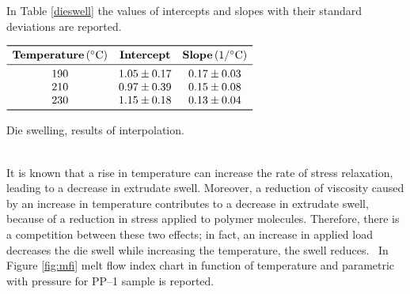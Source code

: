 \documentclass[a4paper, 11pt]{article}
\begin{document}
In Table \ref{dieswell} the values of intercepts and slopes with their standard deviations are reported.
\begin{table}[htp]
	\centering
	$
	\begin{array}{ccc}
	\toprule
	\textbf{Temperature}\, (^\circ \text{C}) & \textbf{Intercept} & \textbf{Slope} \, (1/^\circ \text{C}) \\
	\midrule
	190 & 1.05 \pm 0.17 & 0.17 \pm 0.03 \\
	210 & 0.97 \pm 0.39 & 0.15 \pm 0.08 \\
	230 & 1.15 \pm 0.18 & 0.13 \pm 0.04 \\
	\bottomrule
	\end{array}
	$
	\caption{Die swelling, results of interpolation.}
	\label{tab:dieswell}
\end{table}\\
It is known that a rise in temperature can increase the rate of stress relaxation, leading to a decrease in extrudate swell. Moreover, a reduction of viscosity caused by an increase in temperature contributes to a decrease in extrudate swell, because of a reduction in stress applied to polymer molecules.
Therefore, there is a competition between these two effects; in fact, an increase in applied load decreases the die swell while increasing the temperature, the swell reduces.~\cite{swell}
\newpage
In Figure \ref{fig:mfi} melt flow index chart in function of temperature and parametric with pressure for PP–1 sample is reported.
\end{document}
